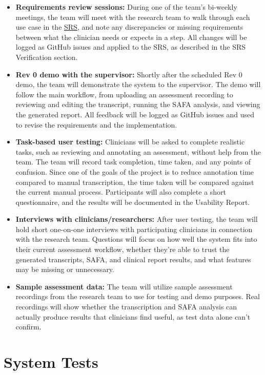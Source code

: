 \documentclass[12pt, titlepage]{article}
\newcommand{\SRSLink}{\href{https://github.com/Nour-Fawaz/MacaBoca/blob/main/pdfs/SRS/SRS.pdf}{SRS}}
\renewcommand{\_}{\oldunderscore\allowbreak}
\begin{document}
\begin{itemize}
  \item \textbf{Requirements review sessions:} During one of the team's bi-weekly meetings, 
  the team will meet with the research team
  to walk through each use case in the \SRSLink, and note any discrepancies or missing
  requirements between what the clinician needs or expects in a step. 
  All changes will be logged as GitHub issues and applied to the SRS, as described 
  in the SRS Verification section.
  \item \textbf{Rev 0 demo with the supervisor:} Shortly after the scheduled
  Rev 0 demo, the team will demonstrate the system to the supervisor. The demo
  will follow the main workflow, from uploading an assessment recording to
  reviewing and editing the transcript, running the SAFA analysis, and
  viewing the generated report. All feedback will be logged as
  GitHub issues and used to revise the requirements and the implementation.
  \item \textbf{Task-based user testing:} Clinicians will be asked to complete
  realistic tasks, such as reviewing and annotating an assessment, without
  help from the team. The team will record task completion, time taken, and
  any points of confusion. Since one of the goals of the project is to reduce
  annotation time compared to manual transcription, the time taken will be
  compared against the current manual process. Participants will also
  complete a short questionnaire, and the results will be documented in the
  Usability Report.
  \item \textbf{Interviews with clinicians/researchers:} After user
  testing, the team will hold short one-on-one interviews with participating
  clinicians in connection with the research team. Questions will focus on
  how well the system fits into their current assessment workflow, whether
  they're able to trust the generated transcripts, SAFA, and clinical report results, 
  and what features may be missing or unnecessary.
  \item \textbf{Sample assessment data:} The team will utilize
  sample assessment recordings from the research team to use for testing and demo
  purposes. Real recordings will show whether the transcription
  and SAFA analysis can actually produce results that clinicians find useful, 
  as test data alone can't confirm.
\end{itemize}

\section{System Tests} \label{sec:System_Tests}
\end{document}
